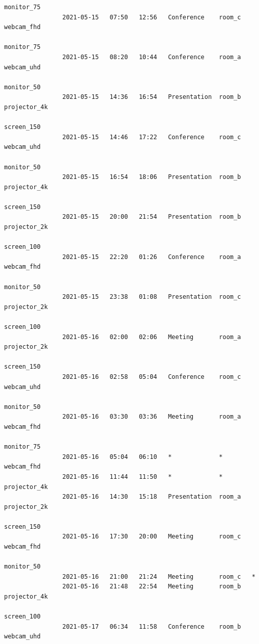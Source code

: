 \documentclass{article}
\begin{document}
\begin{Verbatim}[gobble=8]
                                                                    monitor_75
                2021-05-15   07:50   12:56   Conference    room_c   webcam_fhd
                                                                    monitor_75
                2021-05-15   08:20   10:44   Conference    room_a   webcam_uhd
                                                                    monitor_50
                2021-05-15   14:36   16:54   Presentation  room_b   projector_4k
                                                                    screen_150
                2021-05-15   14:46   17:22   Conference    room_c   webcam_uhd
                                                                    monitor_50
                2021-05-15   16:54   18:06   Presentation  room_b   projector_4k
                                                                    screen_150
                2021-05-15   20:00   21:54   Presentation  room_b   projector_2k
                                                                    screen_100
                2021-05-15   22:20   01:26   Conference    room_a   webcam_fhd
                                                                    monitor_50
                2021-05-15   23:38   01:08   Presentation  room_c   projector_2k
                                                                    screen_100
                2021-05-16   02:00   02:06   Meeting       room_a   projector_2k
                                                                    screen_150
                2021-05-16   02:58   05:04   Conference    room_c   webcam_uhd
                                                                    monitor_50
                2021-05-16   03:30   03:36   Meeting       room_a   webcam_fhd
                                                                    monitor_75
                2021-05-16   05:04   06:10   *             *        webcam_fhd
                2021-05-16   11:44   11:50   *             *        projector_4k
                2021-05-16   14:30   15:18   Presentation  room_a   projector_2k
                                                                    screen_150
                2021-05-16   17:30   20:00   Meeting       room_c   webcam_fhd
                                                                    monitor_50
                2021-05-16   21:00   21:24   Meeting       room_c   *
                2021-05-16   21:48   22:54   Meeting       room_b   projector_4k
                                                                    screen_100
                2021-05-17   06:34   11:58   Conference    room_b   webcam_uhd

\end{Verbatim}
\end{document}
